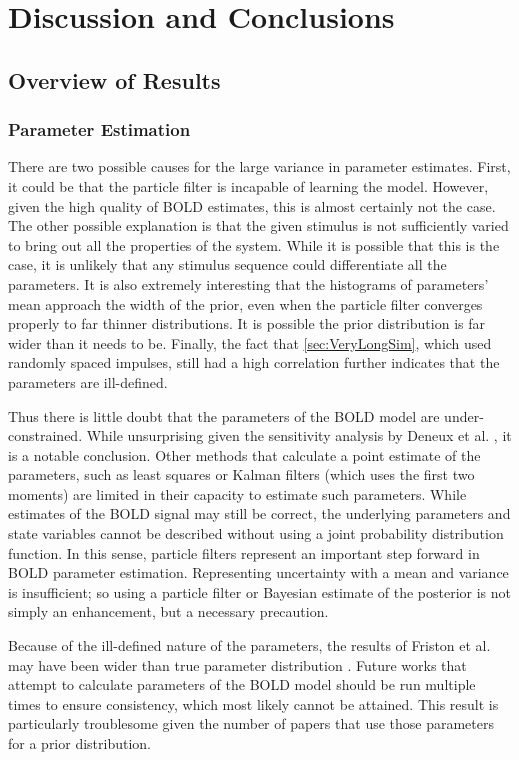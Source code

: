 \chapter{Discussion and Conclusions}
\label{sec:Discussion}
\section{Overview of Results}
\subsection{Parameter Estimation}
There are two possible causes for the large variance in
parameter estimates. First, it could be that the particle filter is
incapable of learning the model. However, given the high quality
of \ac{BOLD} estimates, this is almost certainly not the case. The other
possible explanation is that the given stimulus is not sufficiently
varied to bring out all the properties of the system. While it is
possible that this is the case, it is unlikely that any
stimulus sequence could differentiate all the parameters.
It is also extremely interesting that the histograms of parameters' mean
approach the width of the prior, even when the particle filter converges
properly to far thinner distributions. It is possible the prior
distribution is far wider than
it needs to be. Finally, the fact that \autoref{sec:VeryLongSim}, which
used randomly spaced impulses,
still had a high correlation further indicates that the parameters
are ill-defined.

Thus there is little doubt that the parameters of the \ac{BOLD} model are under-constrained. 
While unsurprising given the sensitivity analysis by Deneux et al. \cite{Deneux2006},
it is a notable conclusion. Other methods
that calculate a point estimate of the parameters, such as least squares
or Kalman filters (which uses the first two moments) are limited in their
capacity to estimate such parameters. While estimates of
the  \ac{BOLD} signal may still be correct, the
underlying parameters and state variables cannot be described without using
a joint probability distribution function. In this sense, particle
filters represent an important step forward in \ac{BOLD} parameter
estimation. Representing uncertainty with a mean
and variance is insufficient; so using a particle filter
or Bayesian estimate of the posterior is not simply an enhancement,
but a necessary precaution.

Because of the ill-defined nature of the parameters, the results
of Friston et al. \cite{Friston2002b} may have been wider than true parameter distribution
. Future works that attempt to calculate parameters
of the \ac{BOLD} model should be run multiple times to ensure consistency,
which most likely cannot be attained. This result is particularly
troublesome given the number of papers that use those parameters for
a prior distribution.

